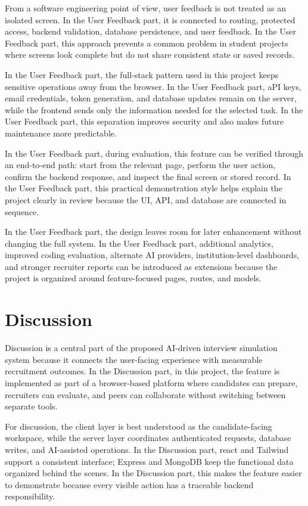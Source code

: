 \documentclass[12pt,a4paper]{report}
\begin{document}
From a software engineering point of view, user feedback is not treated as an isolated screen. In the User Feedback part, it is connected to routing, protected access, backend validation, database persistence, and user feedback. In the User Feedback part, this approach prevents a common problem in student projects where screens look complete but do not share consistent state or saved records.


In the User Feedback part, the full-stack pattern used in this project keeps sensitive operations away from the browser. In the User Feedback part, aPI keys, email credentials, token generation, and database updates remain on the server, while the frontend sends only the information needed for the selected task. In the User Feedback part, this separation improves security and also makes future maintenance more predictable.


In the User Feedback part, during evaluation, this feature can be verified through an end-to-end path: start from the relevant page, perform the user action, confirm the backend response, and inspect the final screen or stored record. In the User Feedback part, this practical demonstration style helps explain the project clearly in review because the UI, API, and database are connected in sequence.


In the User Feedback part, the design leaves room for later enhancement without changing the full system. In the User Feedback part, additional analytics, improved coding evaluation, alternate AI providers, institution-level dashboards, and stronger recruiter reports can be introduced as extensions because the project is organized around feature-focused pages, routes, and models.


\section{Discussion}

Discussion is a central part of the proposed AI-driven interview simulation system because it connects the user-facing experience with measurable recruitment outcomes. In the Discussion part, in this project, the feature is implemented as part of a browser-based platform where candidates can prepare, recruiters can evaluate, and peers can collaborate without switching between separate tools.


For discussion, the client layer is best understood as the candidate-facing workspace, while the server layer coordinates authenticated requests, database writes, and AI-assisted operations. In the Discussion part, react and Tailwind support a consistent interface; Express and MongoDB keep the functional data organized behind the scenes. In the Discussion part, this makes the feature easier to demonstrate because every visible action has a traceable backend responsibility.
\end{document}
